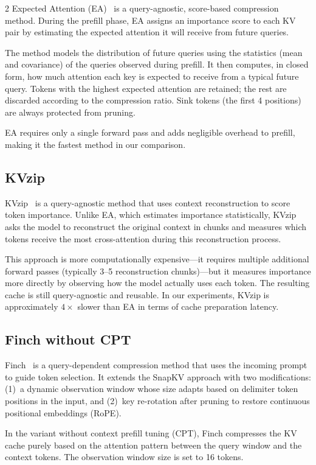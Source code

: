 \documentclass[10pt,a4paper]{article}
\begin{document}
\begin{multicols}{2}
Expected Attention (EA)~\cite{expected-attention} is a query-agnostic,
score-based compression method. During the prefill phase, EA assigns an
importance score to each KV pair by estimating the expected attention it
will receive from future queries.

The method models the distribution of future queries using the statistics
(mean and covariance) of the queries observed during prefill. It then
computes, in closed form, how much attention each key is expected to
receive from a typical future query. Tokens with the highest expected
attention are retained; the rest are discarded according to the
compression ratio. Sink tokens (the first 4 positions) are always
protected from pruning.

EA requires only a single forward pass and adds negligible overhead to
prefill, making it the fastest method in our comparison.

\subsection{KVzip}

KVzip~\cite{kvzip} is a query-agnostic method that uses context
reconstruction to score token importance. Unlike EA, which estimates
importance statistically, KVzip asks the model to reconstruct the
original context in chunks and measures which tokens receive the most
cross-attention during this reconstruction process.

This approach is more computationally expensive---it requires multiple
additional forward passes (typically 3--5 reconstruction chunks)---but
it measures importance more directly by observing how the model actually
uses each token. The resulting cache is still query-agnostic and
reusable. In our experiments, KVzip is approximately $4\times$ slower
than EA in terms of cache preparation latency.

\subsection{Finch without CPT}

Finch~\cite{finch} is a query-dependent compression method that uses the
incoming prompt to guide token selection. It extends the SnapKV approach
with two modifications: (1)~a dynamic observation window whose size
adapts based on delimiter token positions in the input, and (2)~key
re-rotation after pruning to restore continuous positional embeddings
(RoPE).

In the variant without context prefill tuning (CPT), Finch compresses the
KV cache purely based on the attention pattern between the query window
and the context tokens. The observation window size is set to 16 tokens.


\end{multicols}
\end{document}
